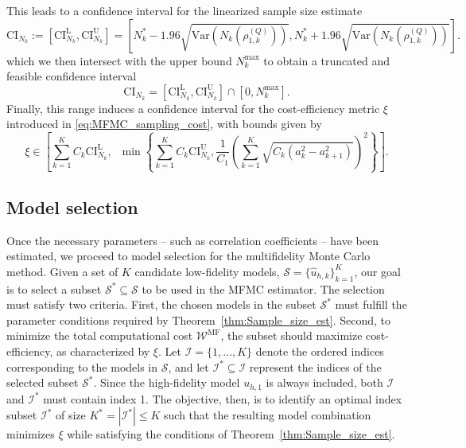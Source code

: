 %
This leads to a confidence interval for the linearized sample size estimate
%
\[
\text{CI}_{N_k} := \left[\text{CI}_{N_k}^{\text{L}},\text{CI}_{N_k}^{\text{U}}\right]=\left[N_k^*-1.96\sqrt{\text{Var}\left(N_k\left(\rho_{1,k}^{(Q)}\right)\right)}, N_k^*+1.96\sqrt{\text{Var}\left(N_k\left(\rho_{1,k}^{(Q)}\right)\right)}\right].
\]
%
which we then intersect with the upper bound $N_k^{\text{max}}$ to obtain a truncated and feasible confidence interval
%
\[
\text{CI}_{N_k} = \left[\text{CI}_{N_k}^{\text{L}},\text{CI}_{N_k}^{\text{U}}\right]\cap \left[0, N_k^{\text{max}}\right].
\]
%
Finally, this range induces a confidence interval for the cost-efficiency metric $\xi$ introduced in \eqref{eq:MFMC_sampling_cost}, with bounds given by
%
\begin{equation}\label{eq:MFMC_sampling_cost_efficiency_CI}
    \xi \in  \left[\sum_{k=1}^K C_k \text{CI}_{N_k}^{\text{L}},\;\;\min \left\{\sum_{k=1}^K C_k \text{CI}_{N_k}^{\text{U}},\frac{1}{C_1} \left(\sum_{k=1}^K\sqrt{C_k\left(a_{k}^2 - a_{k+1}^2\right)}\right)^2\right\}\right].
\end{equation}
%

\subsection{Model selection}\label{sec:Model_Selection}
Once the necessary parameters -- such as correlation coefficients -- have been estimated, we proceed to model selection for the multifidelity Monte Carlo method. Given a set of $K$ candidate low-fidelity models, $\mathcal{S}=\{\widehat u_{h, k}\}_{k=1}^K$, our goal is to select a subset $\mathcal{S}^* \subseteq \mathcal{S}$ to be used in the MFMC estimator. The selection must satisfy two criteria. First, the chosen models in the subset $\mathcal{S}^*$ must fulfill the parameter conditions required by Theorem~\ref{thm:Sample_size_est}. Second, to minimize the total computational cost $\mathcal{W}^{\text{MF}}$, the subset should maximize cost-efficiency, as characterized by $\xi$. Let $\mathcal{I} = \{1,\ldots,K\}$ denote the ordered indices corresponding to the models in $\mathcal{S}$, and let $\mathcal{I}^*\subseteq \mathcal{I}$ represent the indices of the selected subset $\mathcal{S}^*$. Since the high-fidelity model $u_{h,1}$ is always included, both $\mathcal{I}$ and $\mathcal{I}^*$ must contain index 1. The objective, then, is to identify an optimal index subset $\mathcal{I}^*$ of size $K^* = |\mathcal{I}^*| \leq K$ such that the resulting model combination minimizes $\xi$ while satisfying the conditions of Theorem~\ref{thm:Sample_size_est}.


